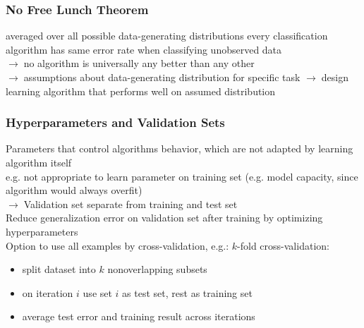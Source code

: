 \documentclass{article}
\newcommand{\arrow}{$\rightarrow\;$}
\begin{document}
\subsubsection*{No Free Lunch Theorem}
averaged over all possible data-generating distributions every classification algorithm has same error rate when classifying unobserved data \\
\arrow no algorithm is universally any better than any other \\
\arrow assumptions about data-generating distribution for specific task \arrow design learning algorithm that performs well on assumed distribution

\subsubsection*{Hyperparameters and Validation Sets}
Parameters that control algorithms behavior, which are not adapted by learning algorithm itself \\
e.g. not appropriate to learn parameter on training set (e.g. model capacity, since algorithm would always overfit) \\
\arrow Validation set separate from training and test set \\
Reduce generalization error on validation set after training by optimizing hyperparameters \\
Option to use all examples by cross-validation, e.g.: $k$-fold cross-validation:
\begin{itemize}
    \item split dataset into $k$ nonoverlapping subsets
    \item on iteration $i$ use set $i$ as test set, rest as training set
    \item average test error and training result across iterations
\end{itemize}
\end{document}
